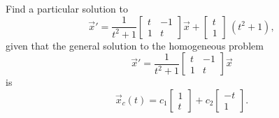 
\begin{example}
Find a particular solution to
\begin{equation} \label{nhsys:vcexeq}
{\vec{x}}'
=
\frac{1}{t^2+1}
\begin{bmatrix}
t & -1 \\
1 & t
\end{bmatrix}
\vec{x}
+ \begin{bmatrix} t \\ 1 \end{bmatrix} \,(t^2+1),
\end{equation} given that the general solution to the homogeneous problem 
\begin{equation*} 
{\vec{x}}'
=
\frac{1}{t^2+1}
\begin{bmatrix}
t & -1 \\
1 & t
\end{bmatrix}
\vec{x}
\end{equation*} is
\begin{equation*}
\vec{x}_c(t) = c_1 \begin{bmatrix} 1 \\ t \end{bmatrix} + c_2 \begin{bmatrix} -t \\ 1 \end{bmatrix}.
\end{equation*}
\end{example}

